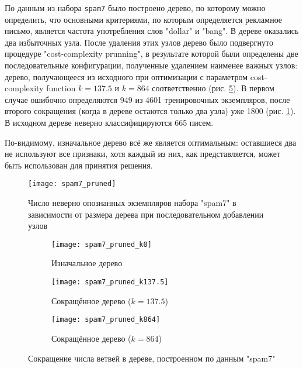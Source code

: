 \documentclass[a4paper,12pt]{article} %
\newcommand{\myPictWidth}{.95\textwidth}
\begin{document}
По данным из набора \texttt{spam7} было построено дерево, по которому можно определить, что основными критериями, по которым определяется рекламное письмо, является частота употребления слов "dollar"\hspace{0pt} и "bang"\hspace{0pt}. В дереве оказались два избыточных узла.
После удаления этих узлов дерево было подвергнуто процедуре "cost-complexity prunning"\hspace{0pt}, в результате которой были определены две последовательные конфигурации, полученные удалением наименее важных узлов: дерево, получающееся из исходного при оптимизации с параметром cost-complexity function $ k = 137.5 $ и $ k = 864 $ соответственно (рис. \ref{fig:spam7_prune}). В первом случае ошибочно определяются 949 из 4601 тренировочных экземпляров, после второго сокращения (когда в дереве остаются только два узла) уже 1800 (рис. \ref{fig:spam7_prune_stats}). В исходном дереве неверно классифицируются 665 писем.

По-видимому, изначальное дерево всё же является оптимальным: оставшиеся два не используют все признаки, хотя каждый из них, как представляется, может быть использован для принятия решения.

\begin{figure}[H]
    \centering \texttt{[image: spam7\_pruned]}
    \caption{Число неверно опознанных экземпляров набора "spam7"\hspace{0pt} в зависимости от размера дерева при последовательном добавлении узлов}
    \label{fig:spam7_prune_stats}
\end{figure}

\begin{figure}[H]
    \centering
    \begin{subfigure}{.9\textwidth}
        \centering
        \texttt{[image: spam7\_pruned\_k0]}
        \caption{Изначальное дерево}
        \label{fig:spam7_k0}
    \end{subfigure}

    \begin{subfigure}{.5\textwidth}
        \centering
        \texttt{[image: spam7\_pruned\_k137.5]}
        \caption{ Сокращённое дерево ($k=137.5$) }
        \label{fig:spam7_k137}
    \end{subfigure}%
    \begin{subfigure}{.5\textwidth}
        \centering
        \texttt{[image: spam7\_pruned\_k864]}
        \caption{ Сокращённое дерево ($k=864$) }
        \label{fig:spam7_k864}
    \end{subfigure}
    \caption{ Сокращение числа ветвей в дереве, построенном по данным "spam7" }
    \label{fig:spam7_prune}
\end{figure}
\end{document}
